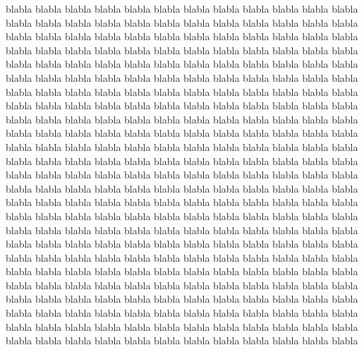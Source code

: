 \documentclass[12pt,a4paper,DIV13,pdftex,BCOR10mm,fleqn,liststotoc,bibtotoc,cleardoubleempty]{scrbook}
\begin{document}
blabla blabla blabla blabla blabla blabla blabla blabla blabla blabla blabla blabla blabla blabla blabla blabla blabla blabla blabla blabla blabla blabla blabla blabla blabla blabla blabla blabla blabla blabla blabla blabla blabla blabla blabla blabla blabla blabla blabla blabla blabla blabla blabla blabla blabla blabla blabla blabla blabla blabla blabla blabla blabla blabla blabla blabla blabla blabla blabla blabla blabla blabla blabla blabla blabla blabla blabla blabla blabla blabla blabla blabla blabla blabla blabla blabla blabla blabla blabla blabla blabla blabla blabla blabla blabla blabla blabla blabla blabla blabla blabla blabla blabla blabla blabla blabla blabla blabla blabla blabla
\newpage
blabla blabla blabla blabla blabla blabla blabla blabla blabla blabla blabla blabla blabla blabla blabla blabla blabla blabla blabla blabla blabla blabla blabla blabla blabla blabla blabla blabla blabla blabla blabla blabla blabla blabla blabla blabla blabla blabla blabla blabla blabla blabla blabla blabla blabla blabla blabla blabla blabla blabla blabla blabla blabla blabla blabla blabla blabla blabla blabla blabla blabla blabla blabla blabla blabla blabla blabla blabla blabla blabla blabla blabla blabla blabla blabla blabla blabla blabla blabla blabla blabla blabla blabla blabla blabla blabla blabla blabla blabla blabla blabla blabla blabla blabla blabla blabla blabla blabla blabla blabla blabla blabla blabla blabla blabla blabla blabla blabla blabla blabla blabla blabla blabla blabla blabla blabla blabla blabla blabla blabla blabla blabla blabla blabla blabla blabla blabla blabla blabla blabla blabla blabla blabla blabla blabla blabla blabla blabla blabla blabla blabla blabla blabla blabla blabla blabla blabla blabla blabla blabla blabla blabla blabla blabla blabla blabla blabla blabla blabla blabla blabla blabla blabla blabla blabla blabla blabla blabla blabla blabla blabla blabla blabla blabla blabla blabla blabla blabla blabla blabla blabla blabla blabla blabla blabla blabla blabla blabla blabla blabla blabla blabla blabla blabla blabla blabla blabla blabla blabla blabla
\end{document}
